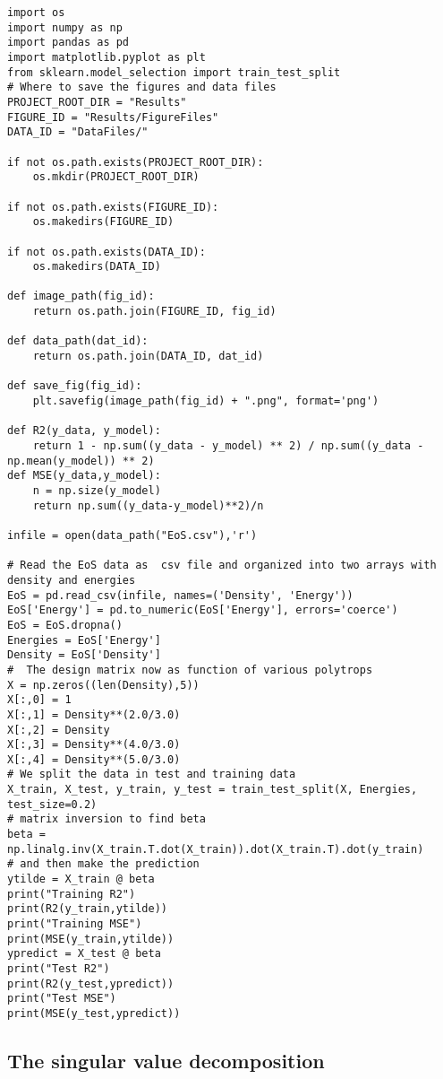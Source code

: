 \documentclass[%
oneside,                 %
final,                   %
10pt]{article}
\begin{document}
\begin{verbatim}
import os
import numpy as np
import pandas as pd
import matplotlib.pyplot as plt
from sklearn.model_selection import train_test_split
# Where to save the figures and data files
PROJECT_ROOT_DIR = "Results"
FIGURE_ID = "Results/FigureFiles"
DATA_ID = "DataFiles/"

if not os.path.exists(PROJECT_ROOT_DIR):
    os.mkdir(PROJECT_ROOT_DIR)

if not os.path.exists(FIGURE_ID):
    os.makedirs(FIGURE_ID)

if not os.path.exists(DATA_ID):
    os.makedirs(DATA_ID)

def image_path(fig_id):
    return os.path.join(FIGURE_ID, fig_id)

def data_path(dat_id):
    return os.path.join(DATA_ID, dat_id)

def save_fig(fig_id):
    plt.savefig(image_path(fig_id) + ".png", format='png')

def R2(y_data, y_model):
    return 1 - np.sum((y_data - y_model) ** 2) / np.sum((y_data - np.mean(y_model)) ** 2)
def MSE(y_data,y_model):
    n = np.size(y_model)
    return np.sum((y_data-y_model)**2)/n

infile = open(data_path("EoS.csv"),'r')

# Read the EoS data as  csv file and organized into two arrays with density and energies
EoS = pd.read_csv(infile, names=('Density', 'Energy'))
EoS['Energy'] = pd.to_numeric(EoS['Energy'], errors='coerce')
EoS = EoS.dropna()
Energies = EoS['Energy']
Density = EoS['Density']
#  The design matrix now as function of various polytrops
X = np.zeros((len(Density),5))
X[:,0] = 1
X[:,1] = Density**(2.0/3.0)
X[:,2] = Density
X[:,3] = Density**(4.0/3.0)
X[:,4] = Density**(5.0/3.0)
# We split the data in test and training data
X_train, X_test, y_train, y_test = train_test_split(X, Energies, test_size=0.2)
# matrix inversion to find beta
beta = np.linalg.inv(X_train.T.dot(X_train)).dot(X_train.T).dot(y_train)
# and then make the prediction
ytilde = X_train @ beta
print("Training R2")
print(R2(y_train,ytilde))
print("Training MSE")
print(MSE(y_train,ytilde))
ypredict = X_test @ beta
print("Test R2")
print(R2(y_test,ypredict))
print("Test MSE")
print(MSE(y_test,ypredict))
\end{verbatim}


\subsection*{The singular value decomposition}
\end{document}
